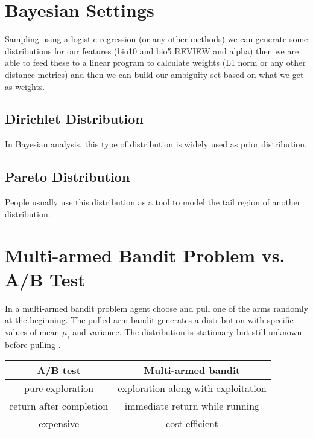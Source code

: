 \documentclass[a4paper,12pt]{article}
\begin{document}

\section{Bayesian Settings}
Sampling using a logistic regression (or any other methods) we can generate some distributions for our features (bio10 and bio5 REVIEW and alpha) then we are able to feed these to a linear program to calculate weights (L1 norm or any other distance metrics) and then we can build our ambiguity set based on what we get as weights.
\subsection{Dirichlet Distribution}
    In Bayesian analysis, this type of distribution is widely used as prior distribution.
    
\subsection{Pareto Distribution}
    People usually use this distribution as a tool to model the tail region of another distribution.


\section{Multi-armed Bandit Problem vs. A/B Test}
In a multi-armed bandit problem agent choose and pull one of the arms randomly at the beginning. The pulled arm bandit generates a distribution with specific values of mean $\mu_i$ and variance. The distribution is stationary but still unknown before pulling \cite{Strehl2008}.

\begin{tabular}{|c|c|}
    \hline
    \textbf{A/B test}    &   \textbf{Multi-armed bandit}  \\
    \hline
    \hline
    pure exploration    &   exploration along with exploitation \\
    \hline
    return after completion &   immediate return while running \\
    \hline
    expensive   &   cost-efficient \\
    \hline
\end{tabular}
\end{document}
